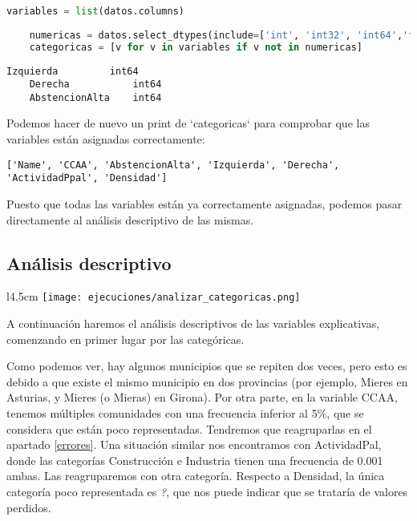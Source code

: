 \documentclass[a4paper,onecolumn]{extarticle}
\begin{document}
\begin{sloppypar}
\begin{lstlisting}[language=Python]
    variables = list(datos.columns)
    
    numericas = datos.select_dtypes(include=['int', 'int32', 'int64','float', 'float32', 'float64']).columns
    categoricas = [v for v in variables if v not in numericas]
\end{lstlisting}

\begin{lstlisting}[numbers=none]
    Izquierda         int64
    Derecha           int64
    AbstencionAlta    int64
\end{lstlisting}

Podemos hacer de nuevo un print de `categoricas` para comprobar que las variables están asignadas correctamente: 
\begin{lstlisting}[numbers=none]
    ['Name', 'CCAA', 'AbstencionAlta', 'Izquierda', 'Derecha', 'ActividadPpal', 'Densidad']
\end{lstlisting}

Puesto que todas las variables están ya correctamente asignadas, podemos pasar directamente al análisis descriptivo de las mismas.

\subsection{Análisis descriptivo}\label{analisis}
\begin{wrapfigure}[9]{l}{4.5cm}
    \texttt{[image: ejecuciones/analizar\_categoricas.png]}
\end{wrapfigure}

A continuación haremos el análisis descriptivos de las variables explicativas, comenzando en primer lugar por las categóricas.

Como podemos ver, hay algunos municipios que se repiten dos veces, pero esto es debido a que existe el mismo municipio en dos provincias (por ejemplo, Mieres 
en Asturias, y Mieres (o Mieras) en Girona). Por otra parte, en la variable CCAA, tenemos múltiples comunidades con una frecuencia inferior al 5\%, que se 
considera que están poco representadas. Tendremos que reagruparlas en el apartado \ref{errores}. Una situación similar nos encontramos con ActividadPal,
donde las categorías Construcción e Industria tienen una frecuencia de 0.001 ambas. Las reagruparemos con otra categoría. Respecto a Densidad, la única categoría 
poco representada es \textit{?}, que nos puede indicar que se trataría de valores perdidos.


\end{sloppypar}
\end{document}
